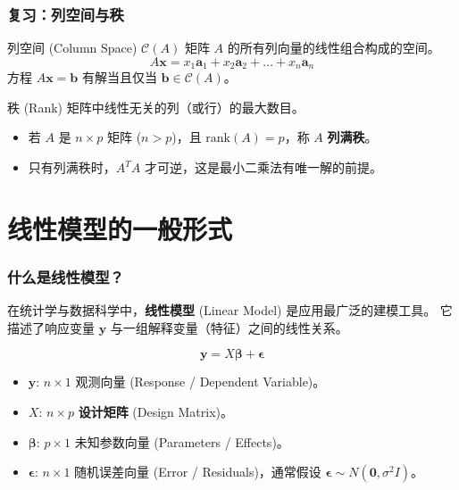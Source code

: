 
\begin{frame}
\frametitle{复习：列空间与秩}

\begin{block}{列空间 (Column Space) $\mathcal{C}(A)$}
矩阵 $A$ 的所有列向量的线性组合构成的空间。
\[
A\mathbf{x} = x_1 \mathbf{a}_1 + x_2 \mathbf{a}_2 + \dots + x_n \mathbf{a}_n
\]
方程 $A\mathbf{x} = \mathbf{b}$ 有解当且仅当 $\mathbf{b} \in \mathcal{C}(A)$。
\end{block}

\begin{block}{秩 (Rank)}
矩阵中线性无关的列（或行）的最大数目。
\begin{itemize}
    \item 若 $A$ 是 $n \times p$ 矩阵 ($n > p$)，且 $\text{rank}(A) = p$，称 $A$ \textbf{列满秩}。
    \item 只有列满秩时，$A^T A$ 才可逆，这是最小二乘法有唯一解的前提。
\end{itemize}
\end{block}

\end{frame}


\section[线性模型]{线性模型的一般形式}


\begin{frame}
\frametitle{什么是线性模型？}

在统计学与数据科学中，\textbf{线性模型} (Linear Model) 是应用最广泛的建模工具。
它描述了响应变量 $\mathbf{y}$ 与一组解释变量（特征）之间的线性关系。

\[
\mathbf{y} = X \boldsymbol{\beta} + \boldsymbol{\epsilon}
\]

\begin{itemize}
    \item $\mathbf{y}$: $n \times 1$ 观测向量 (Response / Dependent Variable)。
    \item $X$: $n \times p$ \textbf{设计矩阵} (Design Matrix)。
    \item $\boldsymbol{\beta}$: $p \times 1$ 未知参数向量 (Parameters / Effects)。
    \item $\boldsymbol{\epsilon}$: $n \times 1$ 随机误差向量 (Error / Residuals)，通常假设 $\boldsymbol{\epsilon} \sim N(\mathbf{0}, \sigma^2 I)$。
\end{itemize}

\end{frame}

